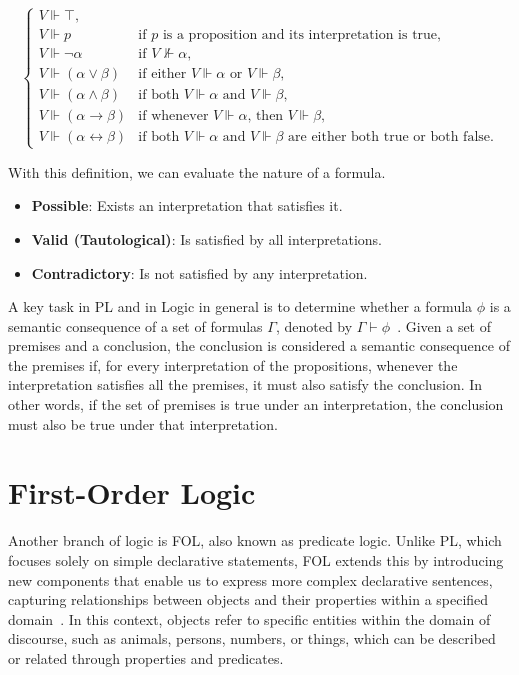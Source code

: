 \[
\left\{
\begin{array}{ll}
    V \Vdash \top \text{,}\\
    V \Vdash p  & \text{if } p \text{ is a proposition and its interpretation is true}, \\
    V \Vdash \neg \alpha & \text{if } V \nVdash \alpha \text{,} \\
    V \Vdash (\alpha \lor \beta) & \text{if either } V \Vdash \alpha \text{ or } V \Vdash \beta \text{,} \\
    V \Vdash (\alpha \land \beta) & \text{if both } V \Vdash \alpha \text{ and } V \Vdash  \beta \text{,} \\
    V \Vdash (\alpha \rightarrow \beta) & \text{if whenever } V \Vdash \alpha \text{, then } V \Vdash \beta\text{,} \\
    V \Vdash (\alpha \leftrightarrow \beta) & \text{if both } V \Vdash \alpha \text{ and } V \Vdash \beta \text{ are either both true or both false.}
\end{array}
\right.
\]

With this definition, we can evaluate the nature of a formula.

\begin{itemize}
    \renewcommand{\labelitemi}{}
    \item \textbf{Possible}: Exists an interpretation that satisfies it.
    \item \textbf{Valid (Tautological)}: Is satisfied by all interpretations.
    \item \textbf{Contradictory}: Is not satisfied by any interpretation.
\end{itemize}

A key task in \gls{PL} and in Logic in general is to determine whether a formula \(\phi\) is a semantic consequence of a set of formulas \(\Gamma\), denoted by \(\Gamma \vdash \phi\)~\cite{gouveia_lgica}. Given a set of premises and a conclusion, the conclusion is considered a semantic consequence of the premises if, for every interpretation of the propositions, whenever the interpretation satisfies all the premises, it must also satisfy the conclusion. In other words, if the set of premises is true under an interpretation, the conclusion must also be true under that interpretation.

\section{First-Order Logic}
\label{chap:fol}
Another branch of logic is \gls{FOL}, also known as predicate logic. Unlike \gls{PL}, which focuses solely on simple declarative statements, \gls{FOL} extends this by introducing new components that enable us to express more complex declarative sentences, capturing relationships between objects and their properties within a specified domain~\cite{huth_2004_logic}. In this context, objects refer to specific entities within the domain of discourse, such as animals, persons, numbers, or things, which can be described or related through properties and predicates.

